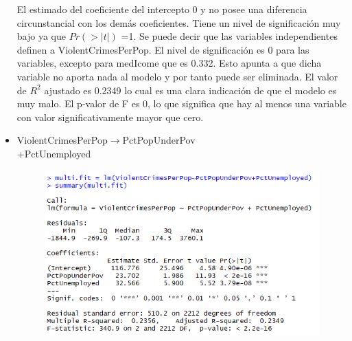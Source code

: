 \documentclass[a4paper,10pt,twocolumn]{article}
\begin{document}
\begin{itemize}
	El estimado del coeficiente del intercepto 0 y no posee una diferencia circunstancial con los demás coeficientes. Tiene un nivel de significación muy bajo ya que  $Pr(> | t | )$ =1.
	Se puede decir que las variables independientes definen a ViolentCrimesPerPop. El nivel de significación es 0 para las variables, excepto para medIcome que es 0.332. Esto apunta a que dicha variable no aporta nada al modelo y por tanto puede ser eliminada. El valor de $R^2$ ajustado es 0.2349 lo cual es una clara indicación de que el modelo es muy malo. El p-valor de F es 0, lo que significa que hay al menos una variable con valor significativamente mayor que cero.

	\item {ViolentCrimesPerPop$\rightarrow$PctPopUnderPov \\ +PctUnemployed}





		\begin{figure}[H]
			\begin{center}
				\includegraphics[width=.92\columnwidth,right]{figures/multifit2.png}
			\end{center}
		\end{figure}


\end{itemize}
\end{document}
